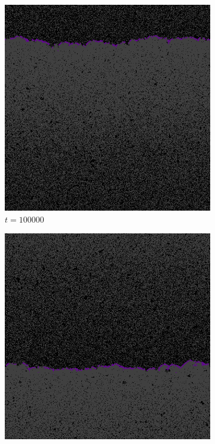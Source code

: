 \begin{figure}
\begin{subfigure}{.12\textwidth}
  \centering
  \includegraphics[width=1\linewidth]{img/sm100000}
  \caption{$t=100000$}
\end{subfigure}%
\begin{subfigure}{.12\textwidth}
  \centering
  \includegraphics[width=1\linewidth]{img/sm200000}

\end{subfigure}
\end{figure}
